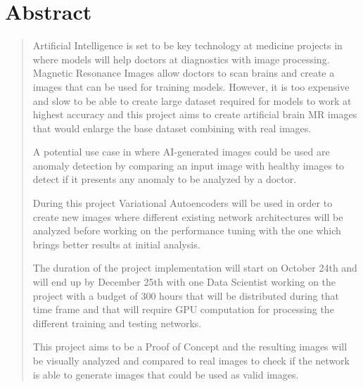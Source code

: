 \chapter*{\centering Abstract}
\begin{quote}
    {Artificial Intelligence is set to be key technology at medicine projects in where models will help doctors at diagnostics with image processing. Magnetic Resonance Images allow doctors to scan brains and create a images that can be used for training models. However, it is too expensive and slow to be able to create large dataset required for models to work at highest accuracy and this project aims to create artificial brain MR images that would enlarge the base dataset combining with real images.
    
    A potential use case in where AI-generated images could be used are anomaly detection by comparing an input image with healthy images to detect if it presents any anomaly to be analyzed by a doctor.
    
    During this project Variational Autoencoders will be used in order to create new images where different existing network architectures will be analyzed before working on the performance tuning with the one which brings better results at initial analysis.
    
    The duration of the project implementation will start on October 24th and will end up by December 25th with one Data Scientist working on the project with a budget of 300 hours that will be distributed during that time frame and that will require GPU computation for processing the different training and testing networks.
    
    This project aims to be a Proof of Concept and the resulting images will be visually analyzed and compared to real images to check if the network is able to generate images that could be used as valid images.}
\end{quote}